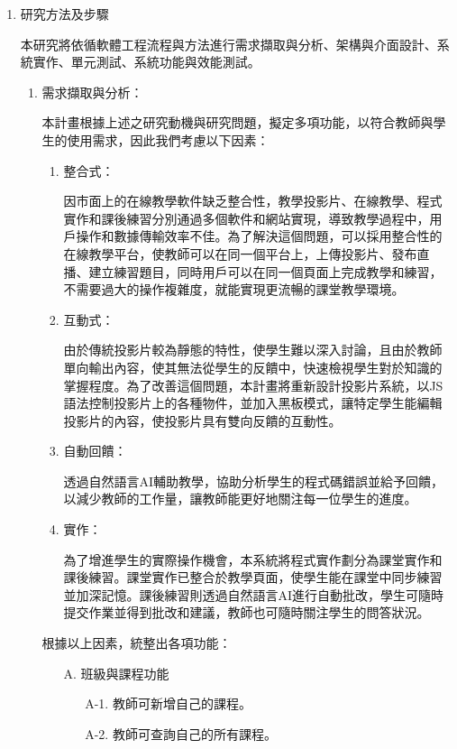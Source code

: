\documentclass[12pt]{article}
\begin{document}
\begin{enumerate}
  \item 研究方法及步驟
    \par 本研究將依循軟體工程流程與方法進行需求擷取與分析、架構與介面設計、系統實作、單元測試、系統功能與效能測試。
    \begin{enumerate}
      \setlength{\parindent}{2em}
      \item 需求擷取與分析：
        \par 本計畫根據上述之研究動機與研究問題，擬定多項功能，以符合教師與學生的使用需求，因此我們考慮以下因素：
        \begin{enumerate}
          \setlength{\parindent}{2em}
          \item 整合式：
            \par 因市面上的在線教學軟件缺乏整合性，教學投影片、在線教學、程式實作和課後練習分別通過多個軟件和網站實現，導致教學過程中，用戶操作和數據傳輸效率不佳。為了解決這個問題，可以採用整合性的在線教學平台，使教師可以在同一個平台上，上傳投影片、發布直播、建立練習題目，同時用戶可以在同一個頁面上完成教學和練習，不需要過大的操作複雜度，就能實現更流暢的課堂教學環境。
          \item 互動式：
            \par 由於傳統投影片較為靜態的特性，使學生難以深入討論，且由於教師單向輸出內容，使其無法從學生的反饋中，快速檢視學生對於知識的掌握程度。為了改善這個問題，本計畫將重新設計投影片系統，以JS語法控制投影片上的各種物件，並加入黑板模式，讓特定學生能編輯投影片的內容，使投影片具有雙向反饋的互動性。
          \item 自動回饋：
            \par 透過自然語言AI輔助教學，協助分析學生的程式碼錯誤並給予回饋，以減少教師的工作量，讓教師能更好地關注每一位學生的進度。
          \item 實作：
            \par 為了增進學生的實際操作機會，本系統將程式實作劃分為課堂實作和課後練習。課堂實作已整合於教學頁面，使學生能在課堂中同步練習並加深記憶。課後練習則透過自然語言AI進行自動批改，學生可隨時提交作業並得到批改和建議，教師也可隨時關注學生的問答狀況。
        \end{enumerate}
       根據以上因素，統整出各項功能：
        \begin{enumerate}
          \item [A.] 班級與課程功能
            \begin{enumerate}
              \item [A-1.] 教師可新增自己的課程。
              \item [A-2.] 教師可查詢自己的所有課程。

\end{enumerate}
\end{enumerate}
\end{enumerate}
\end{enumerate}
\end{document}
